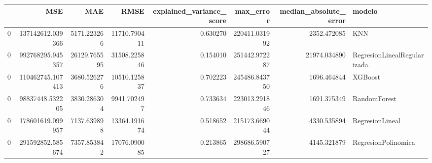\begin{tabular}{lrrrrrrl}
\toprule
 & MSE & MAE & RMSE & explained_variance_score & max_error & median_absolute_error & modelo \\
\midrule
0 & 137142612.039366 & 5171.223266 & 11710.790411 & 0.630270 & 220411.031992 & 2352.472085 & KNN \\
0 & 992768295.945357 & 26129.765595 & 31508.225846 & 0.154010 & 251442.972287 & 21974.034890 & RegresionLinealRegularizada \\
0 & 110462745.107413 & 3680.526276 & 10510.125837 & 0.702223 & 245486.843750 & 1696.464844 & XGBoost \\
0 & 98837448.532205 & 3830.286304 & 9941.702497 & 0.733634 & 223013.291846 & 1691.375349 & RandomForest \\
0 & 178601619.099957 & 7137.639898 & 13364.191674 & 0.518652 & 215173.669044 & 4330.535894 & RegresionLineal \\
0 & 291592852.585674 & 7357.853842 & 17076.090085 & 0.213865 & 298686.590727 & 4145.321879 & RegresionPolinomica \\
\bottomrule
\end{tabular}
